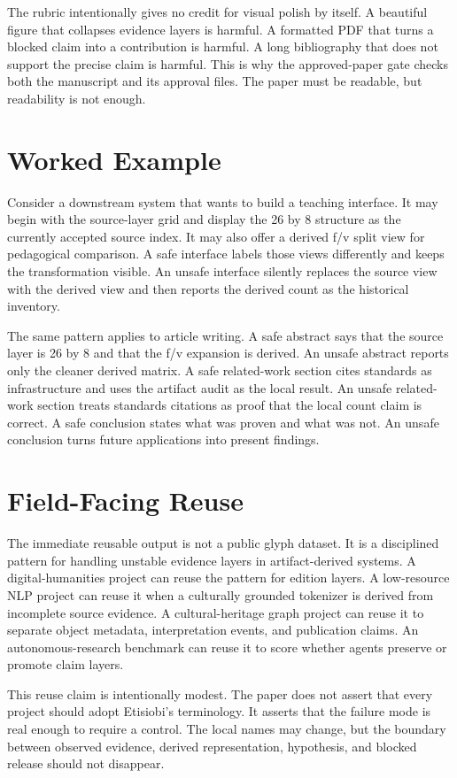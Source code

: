 \documentclass[sigconf,nonacm]{acmart}
\begin{document}
The rubric intentionally gives no credit for visual polish by itself. A
beautiful figure that collapses evidence layers is harmful. A formatted PDF that
turns a blocked claim into a contribution is harmful. A long bibliography that
does not support the precise claim is harmful. This is why the approved-paper
gate checks both the manuscript and its approval files. The paper must be
readable, but readability is not enough.

\section{Worked Example}
Consider a downstream system that wants to build a teaching interface. It may
begin with the source-layer grid and display the 26 by 8 structure as the
currently accepted source index. It may also offer a derived f/v split view for
pedagogical comparison. A safe interface labels those views differently and
keeps the transformation visible. An unsafe interface silently replaces the
source view with the derived view and then reports the derived count as the
historical inventory.

The same pattern applies to article writing. A safe abstract says that the
source layer is 26 by 8 and that the f/v expansion is derived. An unsafe abstract
reports only the cleaner derived matrix. A safe related-work section cites
standards as infrastructure and uses the artifact audit as the local result. An
unsafe related-work section treats standards citations as proof that the local
count claim is correct. A safe conclusion states what was proven and what was
not. An unsafe conclusion turns future applications into present findings.

\section{Field-Facing Reuse}
The immediate reusable output is not a public glyph dataset. It is a disciplined
pattern for handling unstable evidence layers in artifact-derived systems. A
digital-humanities project can reuse the pattern for edition layers. A
low-resource NLP project can reuse it when a culturally grounded tokenizer is
derived from incomplete source evidence. A cultural-heritage graph project can
reuse it to separate object metadata, interpretation events, and publication
claims. An autonomous-research benchmark can reuse it to score whether agents
preserve or promote claim layers.

This reuse claim is intentionally modest. The paper does not assert that every
project should adopt Etisiobi's terminology. It asserts that the failure mode is
real enough to require a control. The local names may change, but the boundary
between observed evidence, derived representation, hypothesis, and blocked
release should not disappear.
\end{document}
